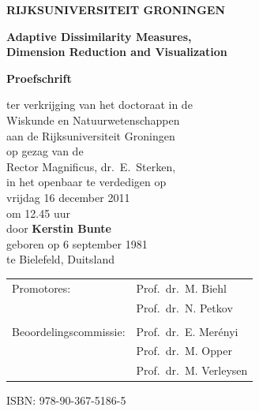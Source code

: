 \cleardoublepage

\thispagestyle{empty}

\parbox[t][0.99\textheight][s]{1\textwidth}{
\centering

\large

{\bf RIJKSUNIVERSITEIT GRONINGEN}

\vspace*{1cm}

\textbf{Adaptive Dissimilarity Measures,\\[.05cm]
Dimension Reduction and Visualization}

\vfill

{\bf Proefschrift}

\bigskip
ter verkrijging van het doctoraat in de\\
Wiskunde en Natuurwetenschappen\\
aan de Rijksuniversiteit Groningen\\
op gezag van de\\
Rector Magnificus, dr.\ E.~Sterken,\\
in het openbaar te verdedigen op\\
vrijdag 16 december 2011\\%
om 12.45 uur%
\\
\vfill
door
\vfill
\textbf{Kerstin Bunte}\\
\vfill
\vspace*{-0.1cm}geboren op 6 september 1981\\
te Bielefeld, Duitsland
}

\newpage

\thispagestyle{empty}


\noindent
\begin{tabular}{@{}ll}
Promotores:             	& Prof.\ dr.\ M. Biehl\\
             			& Prof.\ dr.\ N. Petkov
\\
\\
Beoordelingscommissie:  	& Prof.\ dr.\ E. Mer\'{e}nyi\\ 
                        	& Prof.\ dr.\ M. Opper\\ 
                        	& Prof.\ dr.\ M. Verleysen\\ 
\end{tabular}


\vfill

\noindent
ISBN: 978-90-367-5186-5
\\

